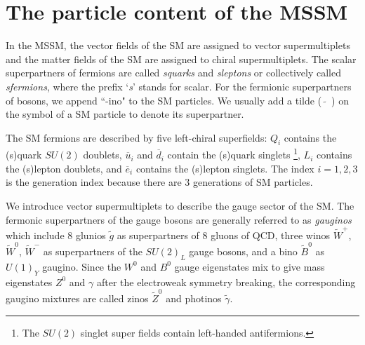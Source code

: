 \documentclass[12pt]{report}
\begin{document}
\section{The particle content of the MSSM}
In the MSSM, the vector fields of the SM are assigned to vector supermultiplets and the matter fields of the SM are assigned to chiral supermultiplets.
The scalar superpartners of fermions are called \textit{squarks} and \textit{sleptons} or collectively called \textit{sfermions}, where the prefix `\textit{s}' stands for scalar.
For the fermionic superpartners of bosons, we append ``-ino" to the SM particles.
We usually add a tilde ($\widetilde{ \quad }$) on the symbol of a SM particle to denote its superpartner.

The SM fermions are described by five left-chiral superfields: $Q_{i}$ contains the (s)quark $SU(2)$ doublets, $\overline{u}_{i}$  and $\overline{d}_{i}$ contain the (s)quark singlets \footnote{The $SU(2)$ singlet super fields contain left-handed antifermions.}, $L_{i}$ contains the (s)lepton doublets, and $\overline{e}_{i}$ contains the (s)lepton singlets.
The index $i = 1, 2, 3$ is the generation index because there are 3 generations of SM particles.

We introduce vector supermultiplets to describe the gauge sector of the SM.
The fermonic superpartners of the gauge bosons are generally referred to as \textit{gauginos} which include 8 glunios $\widetilde{g}$ as superpartners of 8 gluons of QCD, three winos $\widetilde{W}^{+}$, $\widetilde{W}^{0}$, $\widetilde{W}^{-}$ as superpartners of the $SU(2)_{L}$ gauge bosons, and a bino $\widetilde{B}^{0}$ as $U(1)_{Y}$ gaugino.
Since the $W^{0}$ and $B^{0}$ gauge eigenstates mix to give mass eigenstates $Z^{0}$ and $\gamma$ after the electroweak symmetry breaking, the corresponding gaugino mixtures are called zinos $\widetilde{Z}^{0}$ and photinos $\widetilde{\gamma}$.
\end{document}
